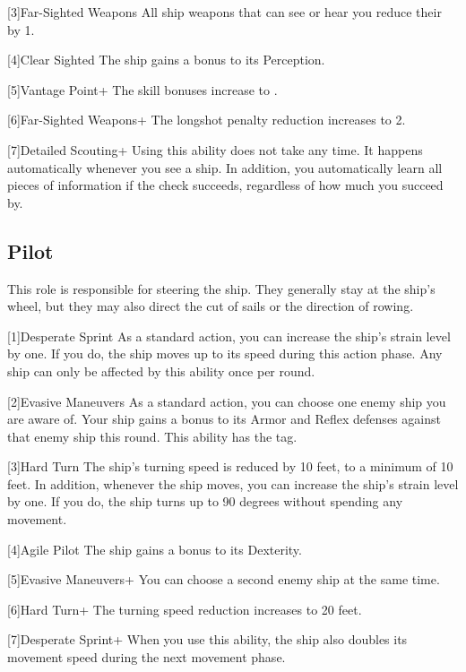     [3]{Far-Sighted Weapons} All ship weapons that can see or hear you reduce their  by 1.

    [4]{Clear Sighted} The ship gains a  bonus to its Perception.

    [5]{Vantage Point+} The skill bonuses increase to .

    [6]{Far-Sighted Weapons+} The longshot penalty reduction increases to 2.

    [7]{Detailed Scouting+} Using this ability does not take any time.
      It happens automatically whenever you see a ship.
      In addition, you automatically learn all pieces of information if the check succeeds, regardless of how much you succeed by.

  \subsection{Pilot}
    This role is responsible for steering the ship.
    They generally stay at the ship's wheel, but they may also direct the cut of sails or the direction of rowing.

    [1]{Desperate Sprint} As a standard action, you can increase the ship's strain level by one.
      If you do, the ship moves up to its speed during this action phase.
      Any ship can only be affected by this ability once per round.

    [2]{Evasive Maneuvers} As a standard action, you can choose one enemy ship you are aware of.
      Your ship gains a  bonus to its Armor and Reflex defenses against that enemy ship this round.
      This ability has the  tag.

    [3]{Hard Turn} The ship's turning speed is reduced by 10 feet, to a minimum of 10 feet.
      In addition, whenever the ship moves, you can increase the ship's strain level by one.
      If you do, the ship turns up to 90 degrees without spending any movement.

    [4]{Agile Pilot} The ship gains a  bonus to its Dexterity.

    [5]{Evasive Maneuvers+} You can choose a second enemy ship at the same time.

    [6]{Hard Turn+} The turning speed reduction increases to 20 feet.

    [7]{Desperate Sprint+} When you use this ability, the ship also doubles its movement speed during the next movement phase.

